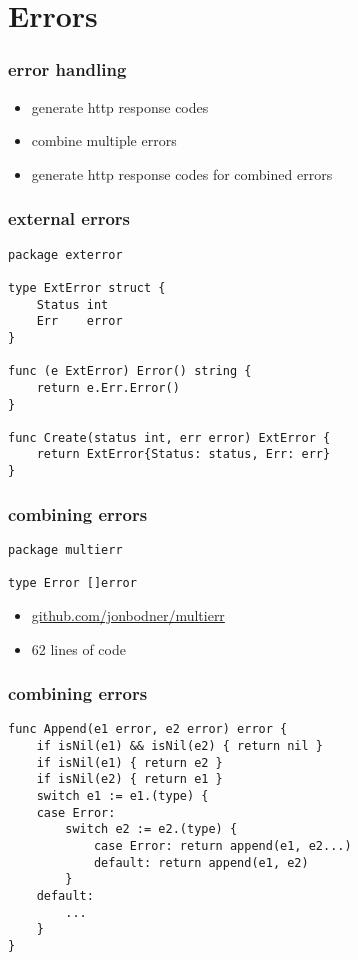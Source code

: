 \documentclass{beamer}
\begin{document}
\section{Errors}

\begin{frame}
\frametitle{error handling}
\begin{itemize}
\item generate http response codes
\item combine multiple errors
\item generate http response codes for combined errors
\end{itemize}
\end{frame}

\begin{frame}[fragile]
\frametitle{external errors}
\begin{lstlisting}[basicstyle=\ttfamily\footnotesize]
package exterror

type ExtError struct {
	Status int
	Err    error
}

func (e ExtError) Error() string {
	return e.Err.Error()
}

func Create(status int, err error) ExtError {
	return ExtError{Status: status, Err: err}
}
\end{lstlisting}
\end{frame}

\begin{frame}[fragile]
\frametitle{combining errors}
\begin{lstlisting}[basicstyle=\ttfamily\footnotesize]
package multierr

type Error []error

\end{lstlisting}
\begin{itemize}
\item \href{https://github.com/jonbodner/multierr}{github.com/jonbodner/multierr}
\item 62 lines of code
\end{itemize}	
\end{frame}

\begin{frame}[fragile]
\frametitle{combining errors}
\begin{lstlisting}[basicstyle=\ttfamily\footnotesize]	
func Append(e1 error, e2 error) error {
	if isNil(e1) && isNil(e2) { return nil }
	if isNil(e1) { return e2 }
	if isNil(e2) { return e1 }
	switch e1 := e1.(type) {
	case Error:
		switch e2 := e2.(type) {
			case Error: return append(e1, e2...)
			default: return append(e1, e2)
		}
	default:
		...
	}
}
\end{lstlisting}
\end{frame}
\end{document}
